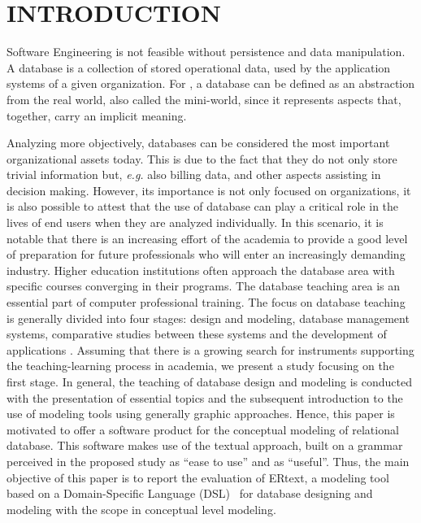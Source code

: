 \documentclass[a4paper,twoside,anonymous]{article}
\begin{document}
\section{\uppercase{Introduction}} 
\label{sec:introduction}

Software Engineering is not feasible without persistence and data manipulation. %
A database is a collection of stored operational data, used by the application systems of a given organization.
For \citet{Elmasri:2011}, a database can be defined as an abstraction from the real world, also called the mini-world, since it represents aspects that, together, carry an implicit meaning.

Analyzing more objectively, databases can be considered the most important organizational assets today.
This is due to the fact that they do not only store trivial information but, \textit{e.g.} also billing data, and other aspects assisting in decision making.
However, its importance is not only focused on organizations, it is also possible to attest that the use of database can play a critical role in the lives of end users when they are analyzed individually.
In this scenario, it is notable that there is an increasing effort of the academia to provide a good level of preparation for future professionals who will enter an increasingly demanding industry.
Higher education institutions often approach the database area with specific courses converging in their programs.
The database teaching area is an essential part of computer professional training.
The focus on database teaching is generally divided into four stages: design and modeling, database management systems, comparative studies between these systems and the development of applications \citep{Aldmour:2010}. %
Assuming that there is a growing search for instruments supporting the teaching-learning process in academia, we present a study focusing on the first stage.
In general, the teaching of database design and modeling is conducted with the presentation of essential topics and the subsequent introduction to the use of modeling tools using generally graphic approaches.
Hence, this paper is motivated to offer a software product for the conceptual modeling of relational database.
This software makes use of the textual approach, built on a grammar perceived in the proposed study as ``ease to use'' and as ``useful''. Thus, the main objective of this paper is to report the evaluation of ERtext, a modeling tool based on a Domain-Specific Language (DSL)~\citep{Kelly08} for database designing and modeling with the scope in conceptual level modeling.
\end{document}
